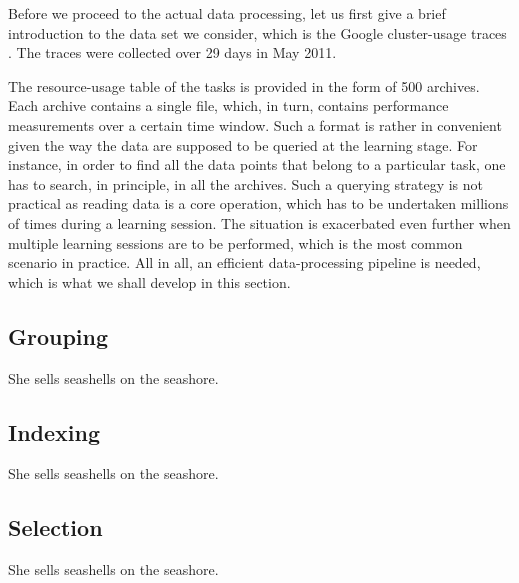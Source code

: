 Before we proceed to the actual data processing, let us first give a brief
introduction to the data set we consider, which is the Google cluster-usage
traces \cite{reiss2011}. The traces were collected over 29 days in May 2011.

The resource-usage table of the tasks is provided in the form of 500 archives.
Each archive contains a single  file, which, in turn, contains
performance measurements over a certain time window. Such a format is rather in
convenient given the way the data are supposed to be queried at the learning
stage. For instance, in order to find all the data points that belong to a
particular task, one has to search, in principle, in all the archives. Such a
querying strategy is not practical as reading data is a core operation, which
has to be undertaken millions of times during a learning session. The situation
is exacerbated even further when multiple learning sessions are to be performed,
which is the most common scenario in practice. All in all, an efficient
data-processing pipeline is needed, which is what we shall develop in this
section.

\subsection{Grouping}
She sells seashells on the seashore.

\subsection{Indexing}
She sells seashells on the seashore.

\subsection{Selection}
She sells seashells on the seashore.
